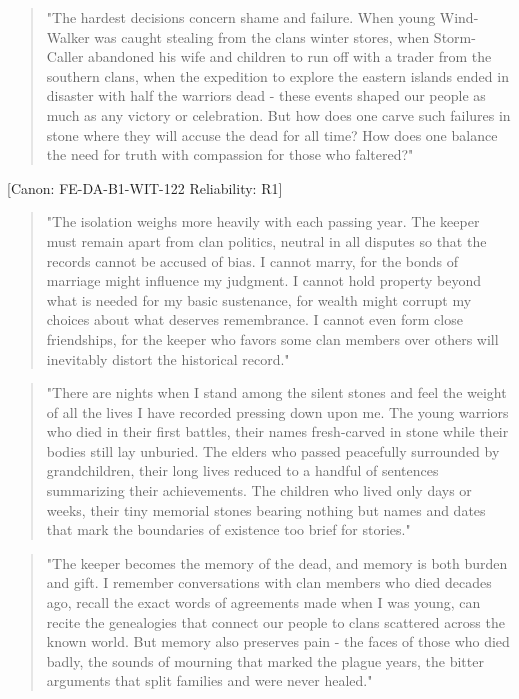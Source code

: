 \begin{quote}
"The hardest decisions concern shame and failure. When young Wind-Walker
was caught stealing from the clan\textquotesingle s winter stores, when
Storm-Caller abandoned his wife and children to run off with a trader
from the southern clans, when the expedition to explore the eastern
islands ended in disaster with half the warriors dead - these events
shaped our people as much as any victory or celebration. But how does
one carve such failures in stone where they will accuse the dead for all
time? How does one balance the need for truth with compassion for those
who faltered?"
\end{quote}

{[}Canon: FE-DA-B1-WIT-122 \textbar{} Reliability: R1{]}

\begin{quote}
"The isolation weighs more heavily with each passing year. The keeper
must remain apart from clan politics, neutral in all disputes so that
the records cannot be accused of bias. I cannot marry, for the bonds of
marriage might influence my judgment. I cannot hold property beyond what
is needed for my basic sustenance, for wealth might corrupt my choices
about what deserves remembrance. I cannot even form close friendships,
for the keeper who favors some clan members over others will inevitably
distort the historical record."
\end{quote}

\begin{quote}
"There are nights when I stand among the silent stones and feel the
weight of all the lives I have recorded pressing down upon me. The young
warriors who died in their first battles, their names fresh-carved in
stone while their bodies still lay unburied. The elders who passed
peacefully surrounded by grandchildren, their long lives reduced to a
handful of sentences summarizing their achievements. The children who
lived only days or weeks, their tiny memorial stones bearing nothing but
names and dates that mark the boundaries of existence too brief for
stories."
\end{quote}

\begin{quote}
"The keeper becomes the memory of the dead, and memory is both burden
and gift. I remember conversations with clan members who died decades
ago, recall the exact words of agreements made when I was young, can
recite the genealogies that connect our people to clans scattered across
the known world. But memory also preserves pain - the faces of those who
died badly, the sounds of mourning that marked the plague years, the
bitter arguments that split families and were never healed."
\end{quote}

